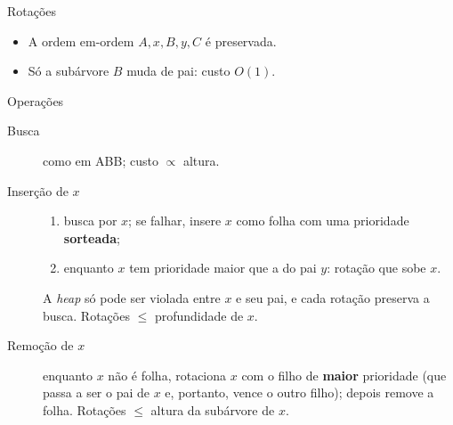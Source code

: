 \documentclass[aspectratio=169,11pt]{beamer}
\newcommand{\tri}[3]{%
  \draw (#1,#2) -- ++(-.45,-.9) -- ++(.9,0) -- cycle;
  \node at (#1,#2-.65) {#3};}
\theoremstyle{definition}
\begin{document}
\begin{frame}{Rotações}
  \centering

  \medskip
  \begin{itemize}
  \item A ordem em-ordem $A,x,B,y,C$ é preservada.
  \item Só a subárvore $B$ muda de pai: custo $O(1)$.
  \end{itemize}
\end{frame}

\begin{frame}{Operações}
  \begin{description}
  \item[Busca] como em ABB; custo $\propto$ altura.
  \pause
  \item[Inserção de $x$]
    \begin{enumerate}
    \item busca por $x$; se falhar, insere $x$ como folha com uma
      prioridade \textbf{sorteada};
    \item enquanto $x$ tem prioridade maior que a do pai $y$: rotação
      que sobe $x$.
    \end{enumerate}
    A \emph{heap} só pode ser violada entre $x$ e seu pai, e cada
    rotação preserva a busca. Rotações $\le$ profundidade de $x$.
  \pause
  \item[Remoção de $x$] enquanto $x$ não é folha, rotaciona $x$ com o
    filho de \textbf{maior} prioridade (que passa a ser o pai de $x$
    e, portanto, vence o outro filho); depois remove a folha.
    Rotações $\le$ altura da subárvore de $x$.
  \end{description}
\end{frame}
\end{document}
